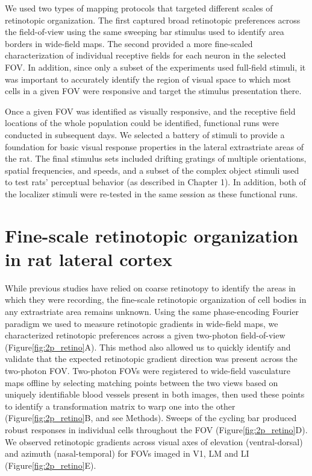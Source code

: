 We used two types of mapping protocols that targeted different scales of retinotopic organization. The first captured broad retinotopic preferences across the field-of-view using the same sweeping bar stimulus used to identify area borders in wide-field maps. The second provided a more fine-scaled characterization of individual receptive fields for each neuron in the selected FOV. In addition, since only a subset of the experiments used full-field stimuli, it was important to accurately identify the region of visual space to which most cells in a given FOV were responsive and target the stimulus presentation there. 

Once a given FOV was identified as visually responsive, and the receptive field locations of the whole population could be identified, functional runs were conducted in subsequent days. We selected a battery of stimuli to provide a foundation for basic visual response properties in the lateral extrastriate areas of the rat. The final stimulus sets included drifting gratings of multiple orientations, spatial frequencies, and speeds, and a subset of the complex object stimuli used to test rats' perceptual behavior (as described in Chapter 1). In addition, both of the localizer stimuli were re-tested in the same session as these functional runs.


\section{Fine-scale retinotopic organization in rat lateral cortex}
While previous studies have relied on coarse retinotopy to identify the areas in which they were recording, the fine-scale retinotopic organization of cell bodies in any extrastriate area remains unknown. Using the same phase-encoding Fourier paradigm we used to measure retinotopic gradients in wide-field maps, we characterized retinotopic preferences across a given two-photon field-of-view (Figure\ref{fig:2p_retino}A). This method also allowed us to quickly identify and validate that the expected retinotopic gradient direction was present across the two-photon FOV. Two-photon FOVs were registered to wide-field vasculature maps offline by selecting matching points between the two views based on uniquely identifiable blood vessels present in both images, then used these points to identify a transformation matrix to warp one into the other (Figure\ref{fig:2p_retino}B, and see Methods). Sweeps of the cycling bar produced robust responses in individual cells throughout the FOV (Figure\ref{fig:2p_retino}D). We observed retinotopic gradients across visual axes of elevation (ventral-dorsal) and azimuth (nasal-temporal) for FOVs imaged in V1, LM and LI (Figure\ref{fig:2p_retino}E). 

